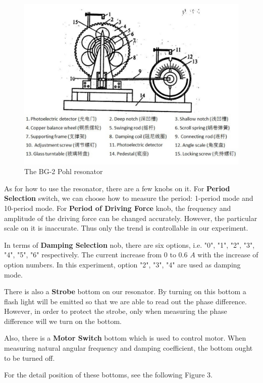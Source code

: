 \documentclass[a4paper,12pt]{article}
\begin{document}
\begin{figure}[h] 
    \centering
    \includegraphics[width=1\textwidth]{Fig2} 
    \caption{The BG-2 Pohl resonator \cite{labmanual}} 
\end{figure}

\par 
As for how to use the resonator, there are a few knobs on it. For \textbf{Period Selection} switch, we can choose how to measure the period: 1-period mode and 10-period mode. For \textbf{Period of Driving Force} knob, the frequency and amplitude of the driving force can be changed accurately. However, the particular scale on it is inaccurate. Thus only the trend is controllable in our experiment.
\par 
In terms of \textbf{Damping Selection} nob, there are six options, i.e. "0", "1", "2", "3", "4", "5", "6" respectively. The current increase from 0 to 0.6 $A$ with the increase of option numbers. In this experiment, option "2", "3", "4" are used as damping mode.
\par 
There is also a \textbf{Strobe} bottom on our resonator. By turning on this bottom a flash light will be emitted so that we are able to read out the phase difference. However, in order to protect the strobe, only when measuring the phase difference will we turn on the bottom.
\par 
Also, there is a \textbf{Motor Switch} bottom which is used to control motor. When measuring natural angular frequency and damping coefficient, the bottom ought to be turned off. 
\par 
For the detail position of these bottoms, see the following Figure 3.
\end{document}
